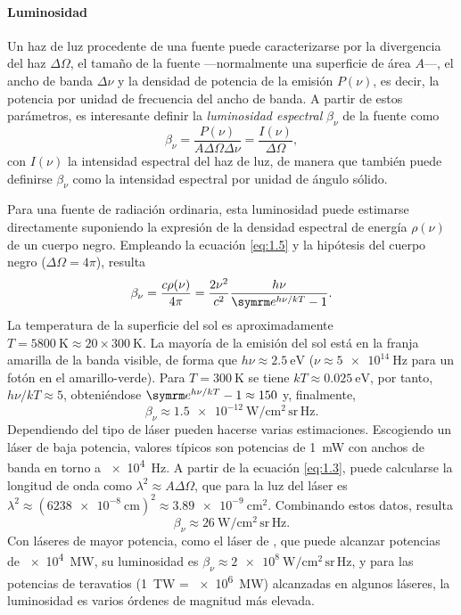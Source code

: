 \paragraph{Luminosidad}\label{par:1.1.2.4}
Un haz de luz procedente de una fuente puede caracterizarse por la divergencia del haz $\Delta\Omega$, el tamaño de la fuente ---normalmente una superficie de área $A$---, el ancho de banda $\Delta\nu$ y la densidad de potencia de la emisión $P(\nu)$, es decir, la potencia por unidad de frecuencia del ancho de banda\autocite{milonniLasers1988}. A partir de estos parámetros, es interesante definir la \emph{luminosidad espectral} $\beta_{\nu}$ de la fuente como 
\begin{equation}\label{eq:1.5}
    \beta_{\nu} = \frac{P(\nu)}{A\Delta\Omega\Delta\nu} = \frac{I(\nu)}{\Delta\Omega},
\end{equation}
con $I(\nu)$ la intensidad espectral del haz de luz, de manera que también puede definirse $\beta_{\nu}$ como la intensidad espectral por unidad de ángulo sólido.

Para una fuente de radiación ordinaria, esta luminosidad puede estimarse directamente suponiendo la expresión de la densidad espectral de energía $\rho(\nu)$ de un cuerpo negro. Empleando la ecuación \eqref{eq:1.5} y la hipótesis del cuerpo negro ($\Delta\Omega=4\pi$), resulta
\begin{equation}\label{eq:1.6}
    \beta_{\nu} = \frac{c\rho(\nu)}{4\pi} = \frac{2\nu^2}{c^2}\dfrac{h\nu}{\eu^{h\nu/kT}-1}.
\end{equation}
La temperatura de la superficie del sol es aproximadamente $T = \qty{5800}{\K} \approx 20 \times \qty{300}{\K}$. La mayoría de la emisión del sol está en la franja amarilla de la banda visible, de forma que $h\nu \approx \qty{2,5}{\eV}$ ($\nu \approx \qty{5e14}{\Hz}$ para un fotón en el amarillo-verde). Para $T = \qty{300}{\K}$ se tiene $kT \approx \qty{0,025}{\eV}$, por tanto, $h\nu/kT \approx 5$, obteniéndose $\eu^{h\nu/kT}-1 \approx 150$ y, finalmente,
\begin{equation}\label{eq:1.7}
    \beta_{\nu} \approx \qty{1,5e-12}{\W\per\cm^2\,\steradian\,\Hz}.
\end{equation}
Dependiendo del tipo de láser pueden hacerse varias estimaciones. Escogiendo un láser  de baja potencia, valores típicos\autocite{milonniLasers1988} son potencias de \qty{1}{\mW} con anchos de banda en torno a \qty{e4}{\Hz}. A partir de la ecuación \eqref{eq:1.3}, puede calcularse la longitud de onda como $\lambda^2 \approx A\Delta\Omega$, que para la luz del láser  es $\lambda^2 \approx (\qty{6238e-8}{\cm})^2 \approx \qty{3,89e-9}{\cm^2}$. Combinando estos datos, resulta 
\begin{equation}\label{eq:1.8}
    \beta_{\nu} \approx \qty{26}{\W\per\cm^2\,\steradian\,\Hz}.
\end{equation}
Con láseres de mayor potencia, como el láser de , que puede alcanzar potencias de \qty{e4}{\MW}, su luminosidad es $\beta_{\nu} \approx \qty{2e8}{\W\per\cm^2\,\steradian\,\Hz}$, y para las potencias de teravatios (\qty{1}{\tera\W} = \qty{e6}{\MW}) alcanzadas en algunos láseres, la luminosidad es varios órdenes de magnitud más elevada.

